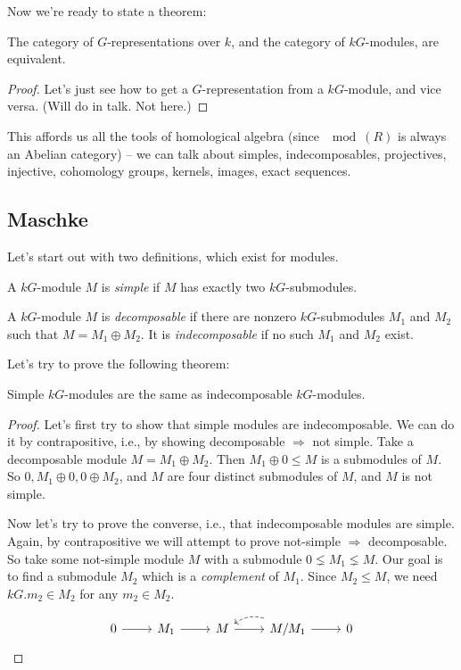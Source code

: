 \documentclass[twoside,11pt,reqno]{amsart}
\begin{document}
Now we're ready to state a theorem:

\begin{theorem}
  The category of $G$-representations over $k$, and the category of $kG$-modules, are equivalent.
\end{theorem}
\begin{proof}
Let's just see how to get a $G$-representation from a $kG$-module, and vice versa. (Will do in talk. Not here.)  
\end{proof}

This affords us all the tools of homological algebra (since $\mod(R)$ is always an Abelian category)  -- we can talk about simples, indecomposables, projectives, injective, cohomology groups, kernels, images, exact sequences.

\subsection{Maschke}
\label{sec:maschke}

Let's start out with two definitions, which exist for modules.

\begin{definition}
  A $kG$-module $M$ is \emph{simple} if $M$ has exactly two $kG$-submodules.
\end{definition}
\begin{definition}
  A $kG$-module $M$ is \emph{decomposable} if there are nonzero $kG$-submodules $M_1$ and $M_2$ such that $M = M_1 \oplus M_2$. It is \emph{indecomposable} if no such $M_1$ and $M_2$ exist.
\end{definition}

Let's try to prove the following theorem:

\begin{proposition}
\color{red} Simple $kG$-modules are the same as indecomposable $kG$-modules.
\end{proposition}
\begin{proof}
  Let's first try to show that simple modules are indecomposable. We can do it by contrapositive, i.e., by showing decomposable $\Rightarrow$ not simple. Take a decomposable module $M = M_1 \oplus M_2$. Then $M_1 \oplus 0 \leq M$ is a submodules of $M$. So $0, M_1 \oplus 0, 0 \oplus M_2$, and $M$ are four distinct submodules of $M$, and $M$ is not simple.

  Now let's try to prove the converse, i.e., that indecomposable modules are simple. Again, by contrapositive we will attempt to prove not-simple $\Rightarrow$ decomposable. So take some not-simple module $M$ with a submodule $0 \lneq M_1 \lneq M$. Our goal is to find a submodule $M_2$ which is a \emph{complement} of $M_1$. Since $M_2 \leq M$, we need $kG.m_2 \in M_2$ for any $m_2 \in M_2$.

  \[
    \begin{tikzcd}
    0 \arrow[r]& M_1 \arrow[r] & M \arrow[r] & M/M_1 \arrow[r] \arrow[l,dashed,bend right=25] & 0
    \end{tikzcd}
  \]
\end{proof}
\end{document}
